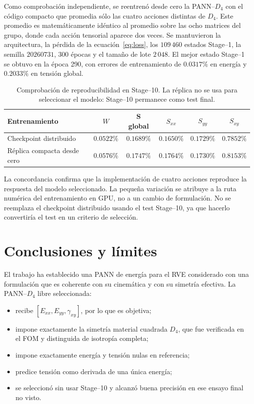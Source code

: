 \documentclass[11pt,a4paper]{article}
\newcommand{\Svec}{\ensuremath{\bm S}}
\newcommand{\Dfour}{\ensuremath{D_4}}
\newcommand{\W}{\ensuremath{W}}
\newcommand{\FOM}{\textsc{FOM}}
\newcommand{\PANN}{\textsc{PANN--}\Dfour}
\begin{document}
Como comprobación independiente, se reentrenó desde cero la \PANN{} con el
código compacto que promedia sólo las cuatro acciones distintas de
\(\Dfour\). Este promedio es matemáticamente idéntico al promedio sobre las
ocho matrices del grupo, donde cada acción tensorial aparece dos veces. Se
mantuvieron la arquitectura, la pérdida de la ecuación~\eqref{eq:loss}, los
\(109\,460\) estados Stage--1, la semilla \(20260731\), \(300\) épocas y el
tamaño de lote \(2\,048\). El mejor estado Stage--1 se obtuvo en la época 290,
con errores de entrenamiento de \(0.0317\%\) en energía y \(0.2033\%\) en
tensión global.

\begin{table}[ht]
\centering
\caption{Comprobación de reproducibilidad en Stage--10. La réplica no se usa
para seleccionar el modelo: Stage--10 permanece como test final.}
\label{tab:retraining}
\begin{tabular}{lccccc}
\toprule
Entrenamiento & \(\W\) & \(\Svec\) global & \(S_{xx}\) & \(S_{yy}\) & \(S_{xy}\)\\
\midrule
Checkpoint distribuido & \(0.0522\%\) & \(0.1689\%\) & \(0.1650\%\) &
\(0.1729\%\) & \(0.7852\%\)\\
Réplica compacta desde cero & \(0.0576\%\) & \(0.1747\%\) & \(0.1764\%\) &
\(0.1730\%\) & \(0.8153\%\)\\
\bottomrule
\end{tabular}
\end{table}

La concordancia confirma que la implementación de cuatro acciones reproduce
la respuesta del modelo seleccionado. La pequeña variación se atribuye a la
ruta numérica del entrenamiento en GPU, no a un cambio de formulación. No se
reemplaza el checkpoint distribuido usando el test Stage--10, ya que hacerlo
convertiría el test en un criterio de selección.

\section{Conclusiones y límites}

El trabajo ha establecido una PANN de energía para el RVE considerado con una
formulación que es coherente con su cinemática y con su simetría efectiva. La
\PANN{} libre seleccionada:
\begin{itemize}
\item recibe \([E_{xx},E_{yy},\gamma_{xy}]\), por lo que es objetiva;
\item impone exactamente la simetría material cuadrada \(\Dfour\), que fue
verificada en el \FOM{} y distinguida de isotropía completa;
\item impone exactamente energía y tensión nulas en referencia;
\item predice tensión como derivada de una única energía;
\item se seleccionó sin usar Stage--10 y alcanzó buena precisión en ese
ensayo final no visto.
\end{itemize}
\end{document}
